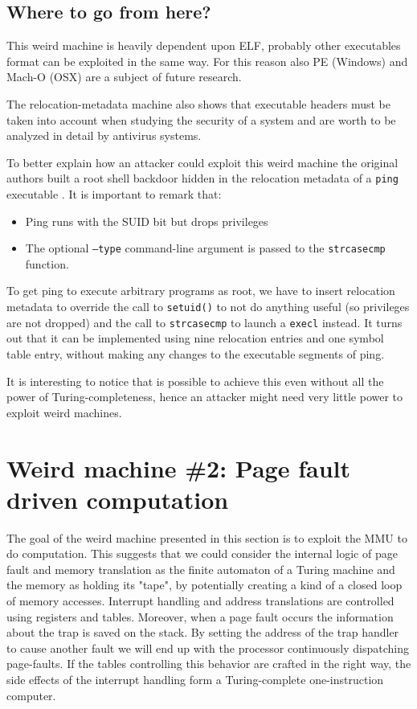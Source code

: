 \documentclass[11pt,twoside,a4paper]{article}
\begin{document}
\subsection{Where to go from here?}
This weird machine is heavily dependent upon ELF, probably other executables format can be exploited in the same way. For this reason also PE (Windows) and Mach-O (OSX) are a subject of future research.

The relocation-metadata machine also shows that executable headers must be taken into account when studying the security of a system and are worth to be analyzed in detail by antivirus systems.

To better explain how an attacker could exploit this weird machine the original authors built a root shell backdoor hidden in the relocation metadata of a \texttt{ping} executable \cite{ping_elf}. It is important to remark that: 
\begin{itemize}
\item Ping runs with the SUID bit but drops privileges 
\item The optional \texttt{--type} command-line argument is passed to the \texttt{strcasecmp} function.
\end{itemize}

To get ping to execute arbitrary programs as root, we have to insert relocation metadata to override the call to \texttt{setuid()} to not do anything useful (so privileges are not dropped) and the call to \texttt{strcasecmp} to launch a \texttt{execl} instead. It turns out that it can be implemented using nine relocation entries and one symbol table entry, without making any changes to the executable segments of ping.

It is interesting to notice that is possible to achieve this even without all the power of Turing-completeness, hence an attacker might need very little power to exploit weird machines.

\section{Weird machine \#2: Page fault driven computation}
The goal of the weird machine presented in this section is to exploit the MMU to do computation. This suggests that we could consider the internal logic of page fault and memory translation as the finite automaton of a Turing machine and the memory as holding its "tape", by potentially creating a kind of a closed loop of memory accesses.
Interrupt handling and address translations are controlled using registers and tables. Moreover, when a page fault occurs the information about the trap is saved on the stack. By setting the address of the trap handler to cause another fault we will end up with the processor continuously dispatching page-faults. If the tables controlling this behavior are crafted in the right way, the side effects of the interrupt handling form a Turing-complete one-instruction computer.
\end{document}
